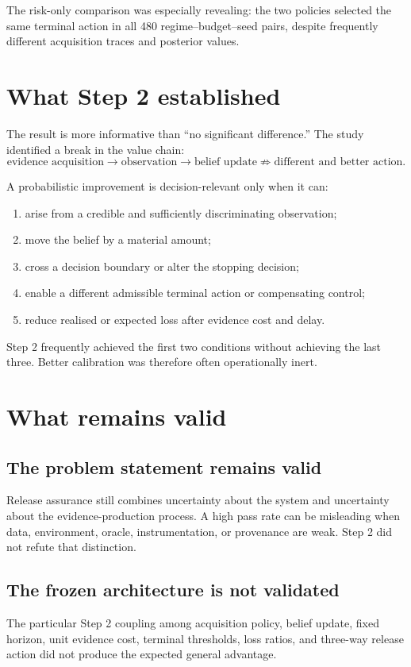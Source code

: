 \documentclass[11pt,a4paper]{article}
\begin{document}
The risk-only comparison was especially revealing: the two policies selected the same terminal action in all 480 regime--budget--seed pairs, despite frequently different acquisition traces and posterior values.

\section{What Step 2 established}

The result is more informative than ``no significant difference.'' The study identified a break in the value chain:
\[
\text{evidence acquisition}
\rightarrow\text{observation}
\rightarrow\text{belief update}
\not\Rightarrow\text{different and better action}.
\]

A probabilistic improvement is decision-relevant only when it can:
\begin{enumerate}
  \item arise from a credible and sufficiently discriminating observation;
  \item move the belief by a material amount;
  \item cross a decision boundary or alter the stopping decision;
  \item enable a different admissible terminal action or compensating control;
  \item reduce realised or expected loss after evidence cost and delay.
\end{enumerate}

Step 2 frequently achieved the first two conditions without achieving the last three. Better calibration was therefore often operationally inert.

\section{What remains valid}

\subsection{The problem statement remains valid}
Release assurance still combines uncertainty about the system and uncertainty about the evidence-production process. A high pass rate can be misleading when data, environment, oracle, instrumentation, or provenance are weak. Step 2 did not refute that distinction.

\subsection{The frozen architecture is not validated}
The particular Step 2 coupling among acquisition policy, belief update, fixed horizon, unit evidence cost, terminal thresholds, loss ratios, and three-way release action did not produce the expected general advantage.
\end{document}

